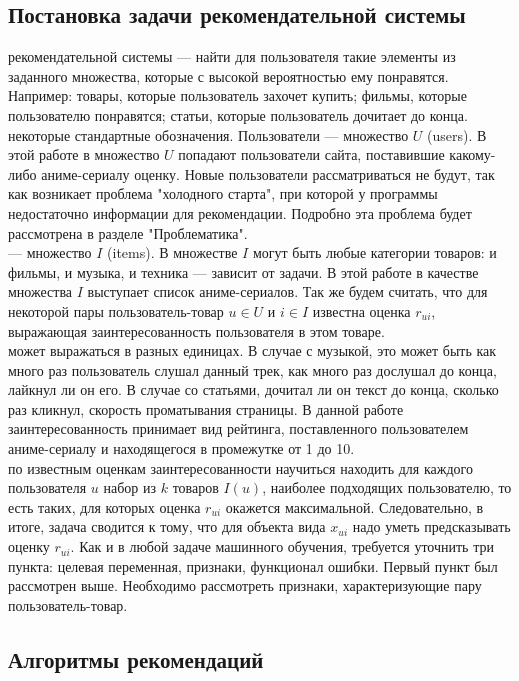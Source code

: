 \documentclass{article}
\newcommand\tab[1][1cm]{\hspace*{#1}}
\begin{document}
\subsection{Постановка задачи рекомендательной системы}
 рекомендательной системы — найти для пользователя такие элементы из заданного множества, которые с высокой вероятностью ему понравятся. Например: товары, которые пользователь захочет купить; фильмы, которые пользователю понравятся; статьи, которые пользователь дочитает до конца.\\
 некоторые стандартные обозначения. Пользователи — множество $﻿U$ (users). В этой работе в множество ﻿$U$ попадают пользователи сайта, поставившие какому-либо аниме-сериалу оценку. Новые пользователи рассматриваться не будут, так как возникает проблема "холодного старта", при которой у программы недостаточно информации для рекомендации. Подробно эта проблема будет рассмотрена в разделе "Проблематика".\\
 — множество ﻿$I$﻿ (items). В множестве $I$ могут быть любые категории товаров: и фильмы, и музыка, и техника — зависит от задачи. В этой работе в качестве множества $I$ выступает список аниме-сериалов. Так же будем считать, что для некоторой пары пользователь-товар ﻿$u\in U$ и $i\in I$﻿﻿ известна оценка $r_{ui}$, выражающая заинтересованность пользователя в этом товаре.\\
 может выражаться в разных единицах. В случае с музыкой, это может быть как много раз пользователь слушал данный трек, как много раз дослушал до конца, лайкнул ли он его. В случае со статьями, дочитал ли он текст до конца, сколько раз кликнул, скорость проматывания страницы. В данной работе заинтересованность принимает вид рейтинга, поставленного пользователем аниме-сериалу и находящегося в промежутке от 1 до 10.\\
 по известным оценкам заинтересованности научиться находить для каждого пользователя $u$ набор из ﻿$k$ товаров ﻿$I(u)$, наиболее подходящих пользователю, то есть таких, для которых оценка ﻿$r_{ui}$ окажется максимальной. Следовательно, в итоге, задача сводится к тому, что для объекта вида ﻿$x_{ui}$ надо уметь предсказывать оценку $r_{ui}$. Как и в любой задаче машинного обучения, требуется уточнить три пункта: целевая переменная, признаки, функционал ошибки. Первый пункт был рассмотрен выше. Необходимо рассмотреть признаки, характеризующие пару пользователь-товар.
\newpage
\subsection{Алгоритмы рекомендаций}
\end{document}
